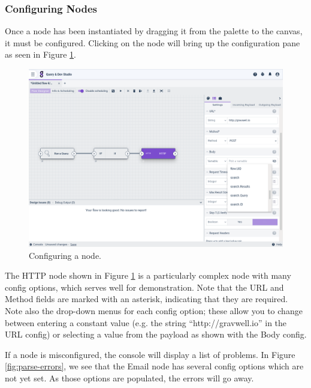 \subsubsection{Configuring Nodes}

Once a node has been instantiated by dragging it from the palette to the canvas, it must be configured. Clicking on the node will bring up the configuration pane as seen in Figure \ref{fig:node-config}.

\begin{figure}
	\includegraphics[width=0.85\linewidth]{images/node-config.png}
	\caption{Configuring a node.}
	\label{fig:node-config}
\end{figure}

The HTTP node shown in Figure \ref{fig:node-config} is a particularly complex node with many config options, which serves well for demonstration. Note that the URL and Method fields are marked with an asterisk, indicating that they are required. Note also the drop-down menus for each config option; these allow you to change between entering a constant value (e.g. the string ``http://gravwell.io'' in the URL config) or selecting a value from the payload as shown with the Body config.


If a node is misconfigured, the console will display a list of problems. In Figure \ref{fig:parse-errors}, we see that the Email node has several config options which are not yet set. As those options are populated, the errors will go away.


